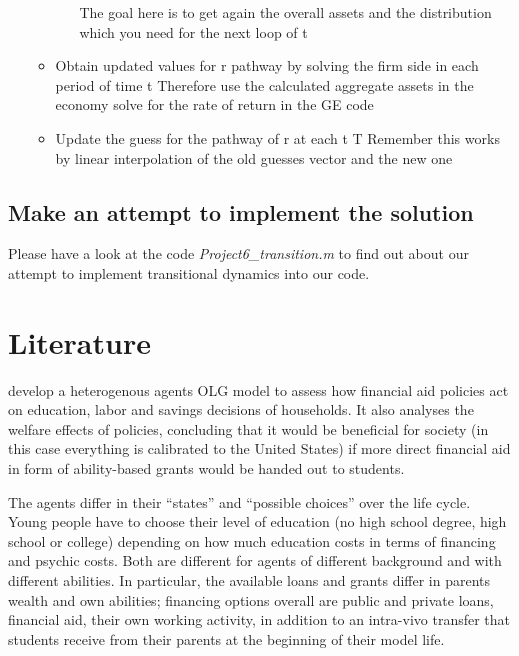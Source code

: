 \documentclass[12pt,a4paper]{article}
\begin{document}
\begin{itemize}
\begin{itemize}
\begin{itemize}
    The goal here is to get again the overall assets and the distribution which you need for the next loop of t
\end{itemize}
\item	Obtain updated values for r pathway by solving the firm side in each period of time t 
Therefore use the calculated aggregate assets in the economy solve for the rate of return in the GE code
\item Update the guess for the pathway of r at each t \E T
Remember this works by linear interpolation of the old guesses vector and the new one
\end{itemize}
\end{itemize}


\subsection{Make an attempt to implement the solution}

Please have a look at the code \textit{Project6\_transition.m} to find out about our attempt to implement transitional dynamics into our code. 


\section{Literature}
\cite{abbott2019education} develop a heterogenous agents OLG model to assess how financial aid policies act on education, labor and savings decisions of households. It also analyses the welfare effects of policies, concluding that it would be beneficial for society (in this case everything is calibrated to the United States) if more direct financial aid in form of ability-based grants would be handed out to students. 

The agents differ in their “states” and “possible choices” over the life cycle. Young people have to choose their level of education (no high school degree, high school or college) depending on how much education costs in terms of financing and psychic costs. Both are different for agents of different background and with different abilities. In particular, the available loans and grants differ in parents wealth and own abilities; financing options overall are public and private loans, financial aid, their own working activity, in addition to an intra-vivo transfer that students receive from their parents at the beginning of their model life. 
\end{document}
